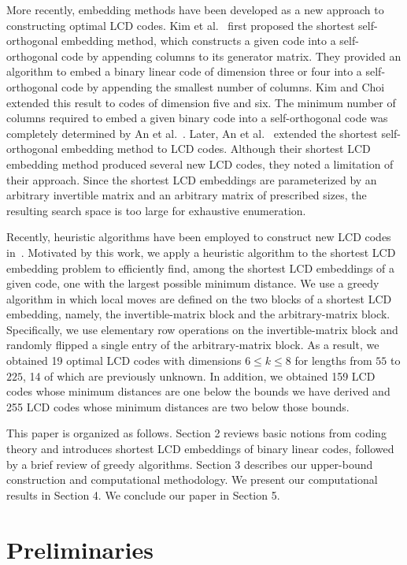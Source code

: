 \documentclass{article}
\theoremstyle{definition}
\theoremstyle{remark}
\begin{document}
More recently, embedding methods have been developed as a new approach to constructing optimal LCD codes. Kim et al.~\cite{KKL-2021} first proposed the shortest self-orthogonal embedding method, which constructs a given code into a self-orthogonal code by appending columns to its generator matrix. They provided an algorithm to embed a binary linear code of dimension three or four into a self-orthogonal code by appending the smallest number of columns. Kim and Choi~\cite{KC-2022} extended this result to codes of dimension five and six. The minimum number of columns required to embed a given binary code into a self-orthogonal code was completely determined by An et al.~\cite{AKKLW-arXiv1}. Later, An et al.~\cite{AHKL-2026} extended the shortest self-orthogonal embedding method to LCD codes. Although their shortest LCD embedding method produced several new LCD codes, they noted a limitation of their approach. Since the shortest LCD embeddings are parameterized by an arbitrary invertible matrix and an arbitrary matrix of prescribed sizes, the resulting search space is too large for exhaustive enumeration.

Recently, heuristic algorithms have been employed to construct new LCD codes in~\cite{WK-2026}. Motivated by this work, we apply a heuristic algorithm to the shortest LCD embedding problem to efficiently find, among the shortest LCD embeddings of a given code, one with the largest possible minimum distance. We use a greedy algorithm in which local moves are defined on the two blocks of a shortest LCD embedding, namely, the invertible-matrix block and the arbitrary-matrix block. Specifically, we use elementary row operations on the invertible-matrix block and randomly flipped a single entry of the arbitrary-matrix block. As a result, we obtained 19 optimal LCD codes with dimensions $6\le k\le 8$ for
lengths from $55$ to $225$, 14 of which are previously unknown. In addition, we obtained 159 LCD codes whose minimum distances are one below the bounds we have derived and 255 LCD codes whose minimum distances are two below those bounds.

This paper is organized as follows. Section 2 reviews basic notions from coding theory and introduces shortest LCD embeddings of binary linear codes, followed by a brief review of greedy algorithms. Section 3 describes our upper-bound construction and computational methodology. We present our computational results in Section 4. We conclude our paper in Section 5.

\section{Preliminaries}
\end{document}
